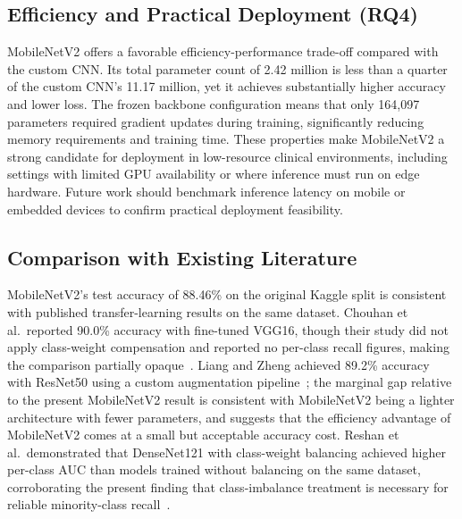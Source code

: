 \documentclass[preprint,12pt]{elsarticle}
\begin{document}
\subsection{Efficiency and Practical Deployment (RQ4)}
MobileNetV2 offers a favorable efficiency-performance trade-off compared
with the custom CNN.
Its total parameter count of 2.42 million is less than a quarter of
the custom CNN's 11.17 million, yet it achieves substantially higher
accuracy and lower loss.
The frozen backbone configuration means that only 164{,}097 parameters
required gradient updates during training, significantly reducing
memory requirements and training time.
These properties make MobileNetV2 a strong candidate for deployment in
low-resource clinical environments, including settings with limited
GPU availability or where inference must run on edge hardware.
Future work should benchmark inference latency on mobile or embedded
devices to confirm practical deployment feasibility.

\subsection{Comparison with Existing Literature}
MobileNetV2's test accuracy of 88.46\% on the original Kaggle split is
consistent with published transfer-learning results on the same dataset.
Chouhan et al.\ reported 90.0\% accuracy with fine-tuned VGG16, though
their study did not apply class-weight compensation and reported no
per-class recall figures, making the comparison partially
opaque~\cite{chouhan2020}.
Liang and Zheng achieved 89.2\% accuracy with ResNet50 using a custom
augmentation pipeline~\cite{liang2020}; the marginal gap relative to the
present MobileNetV2 result is consistent with MobileNetV2 being a
lighter architecture with fewer parameters, and suggests that the
efficiency advantage of MobileNetV2 comes at a small but acceptable
accuracy cost.
Reshan et al.\ demonstrated that DenseNet121 with class-weight
balancing achieved higher per-class AUC than models trained without
balancing on the same dataset, corroborating the present finding that
class-imbalance treatment is necessary for reliable minority-class
recall~\cite{reshan2023}.
\end{document}
